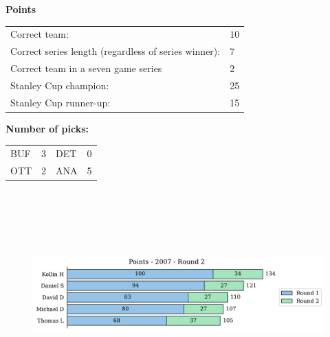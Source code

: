 \documentclass[10pt]{article}
\begin{document}
{\bf Points}\\
\begin{minipage}[t]{12cm}
    \vspace{0pt}
    \begin{tabular}{l l}
        Correct team:	& $10$\\
        Correct series length (regardless of series winner):	& $7$\\
        Correct team in a seven game series    & $2$\\
        Stanley Cup champion:	& 25\\
        Stanley Cup runner-up:	& 15\\
    \end{tabular}

    \vspace{0.5cm}
    {\bf Number of picks:}\\
    \begin{tabular}{lc | lc }
        BUF & 3 & DET & 0 \\
        OTT & 2 & ANA & 5 \\
    \end{tabular}
\end{minipage}
%
\begin{minipage}[t]{13cm}
    \vspace{0pt}
    \begin{figure}[H]
        \vspace{-1cm}
        \includegraphics[width=12cm,height=8cm,keepaspectratio]{../../figures/2007/Points-2007-Round2.pdf}
    \end{figure}
\end{minipage}
\end{document}
